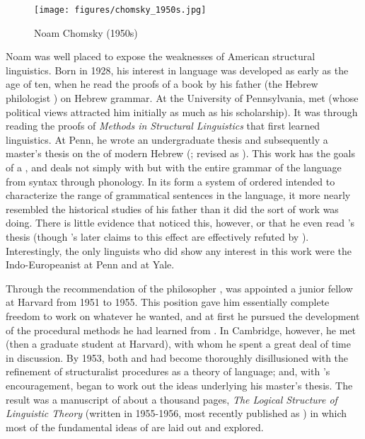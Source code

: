 \begin{wrapfigure}{r}{.35\textwidth}
  \texttt{[image: figures/chomsky\_1950s.jpg]}
  \caption{Noam Chomsky (1950s)}
  \label{fig:ch.genphon.chomsky_1950s}
\end{wrapfigure}
Noam {\Chomsky} was well placed to expose the weaknesses of American
structural linguistics. Born in 1928, his interest in language was
developed as early as the age of ten, when he read the proofs of a
book by his father (the Hebrew philologist ) on Hebrew
grammar. At the University of Pennsylvania, {\Chomsky} met 
(whose political views attracted him initially as much as his
scholarship). It was through reading the proofs of
 \textsl{Methods in Structural Linguistics}
that {\Chomsky} first learned linguistics. At Penn, he wrote an
undergraduate thesis and subsequently a master's thesis on the
 of modern Hebrew (\citealt{chomsky51:mmh}; revised as
\citealt{chomsky79:mmh.revised}). This work has the goals of a
, and deals not simply with  but with
the entire grammar of the language from syntax through phonology. In
its form a system of ordered  intended to characterize the range
of grammatical sentences in the language, it more nearly resembled the
historical studies of his father than it did the sort of work {\Harris}
was doing. There is little evidence that {\Harris} noticed this, however,
or that he even read {\Chomsky}'s thesis (though {\Chomsky}'s later claims
to this effect are effectively refuted by
\citet[sec. 4.5]{newmeyer22:ailt}). Interestingly, the only linguists
who did show any interest in this work were the Indo-Europeanist 
 at Penn and  at Yale.

Through the recommendation of the philosopher , {\Chomsky}
was appointed a junior fellow at Harvard from 1951 to 1955. This
position gave him essentially complete freedom to work on whatever he
wanted, and at first he pursued the development of the procedural
methods he had learned from {\Harris}. In Cambridge, however, he met
 (then a graduate student at Harvard), with whom he spent
a great deal of time in discussion. By 1953, both {\Chomsky} and {\Halle}
had become thoroughly disillusioned with the refinement of
structuralist procedures as a theory of language; and, with {\Halle}'s
encouragement, {\Chomsky} began to work out the ideas underlying his
master's thesis. The result was a manuscript of about a thousand
pages, \textsl{The Logical Structure of Linguistic Theory} (written in
1955-1956, most recently published as \citealt{chomsky85:lslt}) in
which most of the fundamental ideas of  are laid out
and explored.

